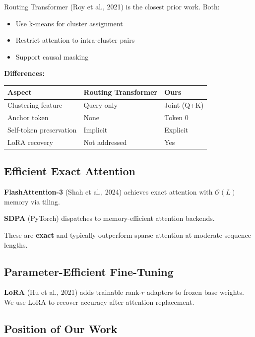 Routing Transformer (Roy et al., 2021) is the closest prior work. Both:

\begin{itemize}
\item Use k-means for cluster assignment
\item Restrict attention to intra-cluster pairs
\item Support causal masking

\end{itemize}
\textbf{Differences:}

\begin{table}[H]
\centering
\small
\begin{tabular}{lll}
\toprule
\textbf{Aspect} & \textbf{Routing Transformer} & \textbf{Ours} \\
\midrule
Clustering feature & Query only & Joint (Q+K) \\
Anchor token & None & Token 0 \\
Self-token preservation & Implicit & Explicit \\
LoRA recovery & Not addressed & Yes \\
\bottomrule
\end{tabular}
\end{table}

\subsection{Efficient Exact Attention}

\textbf{FlashAttention-3} (Shah et al., 2024) achieves exact attention with 
$\mathcal{O}(L)$ memory via tiling.

\textbf{SDPA} (PyTorch) dispatches to memory-efficient attention backends.

These are \textbf{exact} and typically outperform sparse attention at moderate 
sequence lengths.

\subsection{Parameter-Efficient Fine-Tuning}

\textbf{LoRA} (Hu et al., 2021) adds trainable rank-$r$ adapters to frozen base 
weights. We use LoRA to recover accuracy after attention replacement.

\subsection{Position of Our Work}

